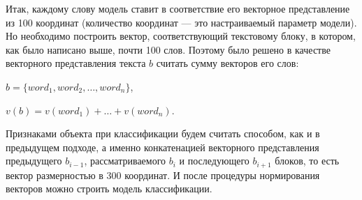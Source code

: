 \documentclass[12pt]{article}
\begin{document}
Итак, каждому слову модель ставит в соответствие его векторное представление из 100 координат (количество координат --- это настраиваемый параметр модели). Но необходимо построить вектор, соответствующий текстовому блоку, в котором, как было написано выше, почти 100 слов. Поэтому было решено в качестве векторного представления текста $b$ считать сумму векторов его слов:
\begin{center}
$b = \{word_1, word_2, …, word_n\}$,

$v(b) = v(word_1) +\ldots + v(word_n)$.
\end{center}

Признаками объекта при классификации будем считать способом, как и в предыдущем подходе, а именно конкатенацией векторного представления предыдущего $b_{i-1}$, рассматриваемого $b_i$ и последующего $b_{i+1}$ блоков, то есть вектор размерностью в 300 координат. И после процедуры нормирования векторов можно строить модель классификации.
\end{document}
